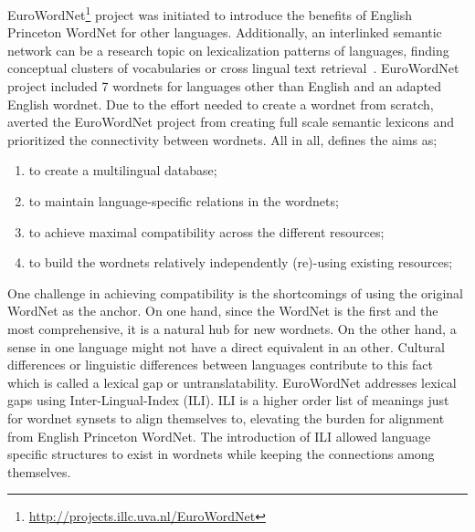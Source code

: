 EuroWordNet\footnote{\url{http://projects.illc.uva.nl/EuroWordNet}} project was initiated to introduce the benefits of English Princeton WordNet for other languages.
Additionally, an interlinked semantic network can be a research topic on lexicalization patterns of languages, finding conceptual clusters of vocabularies or cross lingual text retrieval~\cite{gonzalo_applying_1998, vossenIntroduction1998}.
EuroWordNet project included 7 wordnets for languages other than English and an adapted English wordnet.
Due to the effort needed to create a wordnet from scratch, \citeauthor{vossenIntroduction1998} averted the EuroWordNet project from creating full scale semantic lexicons and prioritized the connectivity between wordnets.
All in all, \textcite{vossenIntroduction1998} defines the aims as;
\begin{displayquote}
    \begin{enumerate}
        \item to create a multilingual database;
        \item to maintain language-specific relations in the wordnets;
        \item to achieve maximal compatibility across the different resources;
        \item to build the wordnets relatively independently (re)-using existing resources;
    \end{enumerate}
\end{displayquote}

One challenge in achieving compatibility is the shortcomings of using the original WordNet as the anchor.
On one hand, since the WordNet is the first and the most comprehensive, it is a natural hub for new wordnets.
On the other hand, a sense in one language might not have a direct equivalent in an other.
Cultural differences or linguistic differences between languages contribute to this fact~\cite{kitamura_cultural_2009} which is called a lexical gap or untranslatability.
EuroWordNet addresses lexical gaps using Inter-Lingual-Index (ILI).
ILI is a higher order list of meanings just for wordnet synsets to align themselves to, elevating the burden for alignment from English Princeton WordNet.
The introduction of ILI allowed language specific structures to exist in wordnets while keeping the connections among themselves.


